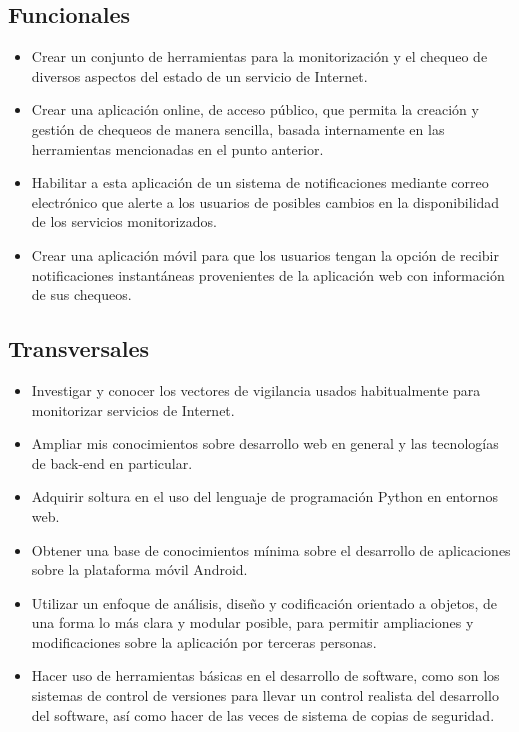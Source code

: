 \subsection{Funcionales}
\begin{itemize}
\item Crear un conjunto de herramientas para la monitorización y el chequeo de
  diversos aspectos del estado de un servicio de Internet.
\item Crear una aplicación online, de acceso público, que permita la creación y
  gestión de chequeos de manera sencilla, basada internamente en las
  herramientas mencionadas en el punto anterior.
\item Habilitar a esta aplicación de un sistema de notificaciones mediante correo
  electrónico que alerte a los usuarios de posibles cambios en la disponibilidad
  de los servicios monitorizados.
\item Crear una aplicación móvil para que los usuarios tengan la opción de
  recibir notificaciones instantáneas provenientes de la aplicación web con
  información de sus chequeos.
\end{itemize}

\subsection{Transversales}
\begin{itemize}
\item Investigar y conocer los vectores de vigilancia usados habitualmente para
  monitorizar servicios de Internet.
\item Ampliar mis conocimientos sobre desarrollo web en general y las
  tecnologías de back-end en particular.
\item Adquirir soltura en el uso del lenguaje de programación Python en entornos
  web.
\item Obtener una base de conocimientos mínima sobre el desarrollo de
  aplicaciones sobre la plataforma móvil Android.
\item Utilizar un enfoque de análisis, diseño y codificación orientado
  a objetos, de una forma lo más clara y modular posible, para
  permitir ampliaciones y modificaciones sobre la aplicación por
  terceras personas.
\item Hacer uso de herramientas básicas en el desarrollo de software,
  como son los sistemas de control de versiones para llevar
  un control realista del desarrollo del software, así como hacer de
  las veces de sistema de copias de seguridad.
\end{itemize}

